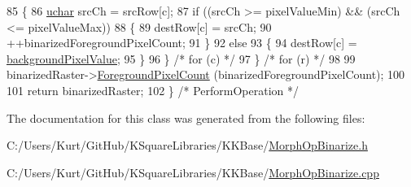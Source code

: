 \begin{DoxyCode}
85     \{
86       \hyperlink{namespace_k_k_b_ace9969169bf514f9ee6185186949cdf7}{uchar}  srcCh = srcRow[c];
87       \textcolor{keywordflow}{if}  ((srcCh >= pixelValueMin)  &&  (srcCh <= pixelValueMax))
88       \{
89         destRow[c] = srcCh;
90         ++binarizedForegroundPixelCount;
91       \}
92       \textcolor{keywordflow}{else}
93       \{
94         destRow[c] = \hyperlink{class_k_k_b_1_1_morph_op_a0c3862d1c8427c4d246e0bcd56699741}{backgroundPixelValue};
95       \}
96     \}  \textcolor{comment}{/* for (c) */}
97   \}  \textcolor{comment}{/* for (r) */}
98 
99   binarizedRaster->\hyperlink{class_k_k_b_1_1_raster_a38425a410e40696276be4f22de702eb6}{ForegroundPixelCount} (binarizedForegroundPixelCount);
100 
101   \textcolor{keywordflow}{return}  binarizedRaster;
102 \}  \textcolor{comment}{/* PerformOperation */}
\end{DoxyCode}


The documentation for this class was generated from the following files\+:\begin{DoxyCompactItemize}
\item 
C\+:/\+Users/\+Kurt/\+Git\+Hub/\+K\+Square\+Libraries/\+K\+K\+Base/\hyperlink{_morph_op_binarize_8h}{Morph\+Op\+Binarize.\+h}\item 
C\+:/\+Users/\+Kurt/\+Git\+Hub/\+K\+Square\+Libraries/\+K\+K\+Base/\hyperlink{_morph_op_binarize_8cpp}{Morph\+Op\+Binarize.\+cpp}\end{DoxyCompactItemize}
